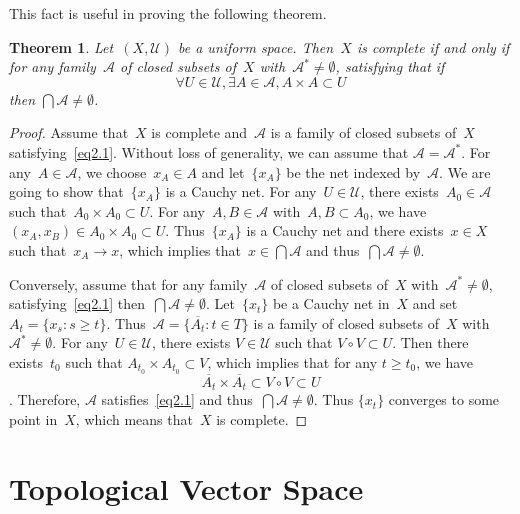 \documentclass[12pt,a4paper,draft]{article}  %
\newtheorem{theorem}{Theorem}[section]
\theoremstyle{definition}
\numberwithin{equation}{section}
\begin{document}
This fact is useful in proving the following theorem.
\begin{theorem} \label{thm2.5}
    Let~$(X,\mathcal{U})$ be a uniform space. Then~$X$ is complete if and only if
    for any family~$\mathcal{A}$ of closed subsets of~$X$ with~$\mathcal{A}^{*} \neq \emptyset$,
    satisfying that if 
    \begin{equation} \label{eq2.1}
    \forall U \in \mathcal{U}, \exists A \in \mathcal{A}, A \times A \subset U
    \end{equation}
    then $\bigcap \mathcal{A} \neq \emptyset$.
\end{theorem}
\begin{proof}
    Assume that~$X$ is complete and~$\mathcal{A}$ is a family of closed subsets of~$X$
    satisfying~\eqref{eq2.1}.
    Without loss of generality, we can assume that $\mathcal{A}=\mathcal{A}^{*}$.
    For any~$A \in \mathcal{A}$, we choose~$x_A \in A$ and let~$\{x_A\}$ be the net indexed by~$\mathcal{A}$.
    We are going to show that~$\{x_A\}$ is a Cauchy net.
    For any~$U \in \mathcal{U}$, there exists~$A_0 \in \mathcal{A}$ such that~$A_0 \times A_0 \subset U$.
    For any~$A,B \in \mathcal{A}$ with~$A,B \subset A_0$, we have~$(x_A,x_B) \in A_0 \times A_0 \subset U$.
    Thus~$\{x_A\}$ is a Cauchy net and there exists~$x \in X$ such that~$x_A \rightarrow x$,
    which implies that~$x \in \bigcap \mathcal{A}$ and thus~$\bigcap \mathcal{A} \neq \emptyset$.

    Conversely, assume that for any family~$\mathcal{A}$ of closed subsets of~$X$ with~$\mathcal{A}^{*} \neq \emptyset$,
    satisfying~\eqref{eq2.1} then~$\bigcap \mathcal{A} \neq \emptyset$. 
    Let~$\{x_t\}$ be a Cauchy net in~$X$ and set~$A_t={\{x_s: s \geq t\}}$.
    Thus~$\mathcal{A}=\{\overline{A_t}: t \in T\}$ is a family of closed subsets of~$X$ with~$\mathcal{A}^{*}\neq \emptyset$.
    For any~$U \in \mathcal{U}$, there exists $V \in \mathcal{U}$ such that $V \circ V \subset U$.
    Then there exists~$t_0$ such that $A_{t_0} \times A_{t_0} \subset V$, which implies that for any $t \geq t_0$, 
    we have 
    $$ \overline{A_t} \times \overline{A_t} \subset V \circ V \subset U $$.
    Therefore, $\mathcal{A}$ satisfies~\eqref{eq2.1} and thus~$\bigcap \mathcal{A} \neq \emptyset$.
    Thus $\{x_t\}$ converges to some point in~$X$, which means that~$X$ is complete.
\end{proof}

\section{Topological Vector Space}
\end{document}
